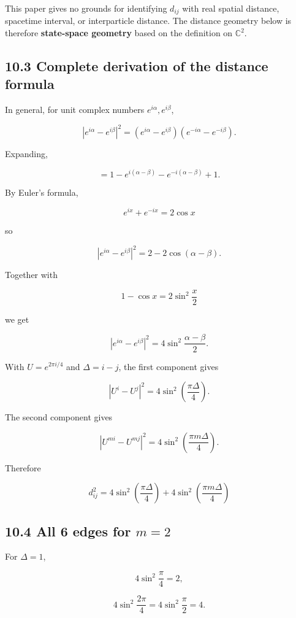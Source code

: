 \documentclass[
  a4paper,
]{article}
\begin{document}
This paper gives no grounds for identifying \(d_{ij}\) with real spatial
distance, spacetime interval, or interparticle distance. The distance
geometry below is therefore \textbf{state-space geometry} based on the
definition on \(\mathbb C^2\).

\subsection{10.3 Complete derivation of the distance
formula}\label{complete-derivation-of-the-distance-formula}

In general, for unit complex numbers \(e^{i\alpha},e^{i\beta}\),

\[
|e^{i\alpha}-e^{i\beta}|^2
=
(e^{i\alpha}-e^{i\beta})(e^{-i\alpha}-e^{-i\beta}).
\]

Expanding,

\[
=
1-e^{i(\alpha-\beta)}-e^{-i(\alpha-\beta)}+1.
\]

By Euler's formula,

\[
e^{ix}+e^{-ix}=2\cos x
\]

so

\[
|e^{i\alpha}-e^{i\beta}|^2
=
2-2\cos(\alpha-\beta).
\]

Together with

\[
1-\cos x
=
2\sin^2\frac{x}{2}
\]

we get

\[
|e^{i\alpha}-e^{i\beta}|^2
=
4\sin^2\frac{\alpha-\beta}{2}.
\]

With \(U=e^{2\pi i/4}\) and \(\Delta=i-j\), the first component gives

\[
|U^i-U^j|^2
=
4\sin^2\left(\frac{\pi\Delta}{4}\right).
\]

The second component gives

\[
|U^{mi}-U^{mj}|^2
=
4\sin^2\left(\frac{\pi m\Delta}{4}\right).
\]

Therefore

\[
\boxed{
d_{ij}^2
=
4\sin^2\left(\frac{\pi\Delta}{4}\right)
+
4\sin^2\left(\frac{\pi m\Delta}{4}\right)
}
\]

\subsection{\texorpdfstring{10.4 All 6 edges for
\(m=2\)}{10.4 All 6 edges for m=2}}\label{all-6-edges-for-m2}

For \(\Delta=1\),

\[
4\sin^2\frac{\pi}{4}=2,
\]

\[
4\sin^2\frac{2\pi}{4}
=
4\sin^2\frac{\pi}{2}
=4.
\]
\end{document}
